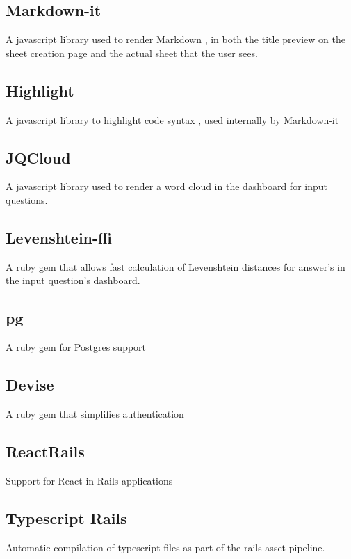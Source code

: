 \subsection{Markdown-it}
A javascript library used to render Markdown , in both the title preview on the sheet creation page and the actual sheet that the user sees.

\subsection{Highlight}
A javascript library to highlight code syntax , used internally by Markdown-it
	
\subsection{JQCloud}
A javascript library used to render a word cloud in the dashboard for input questions.

\subsection{Levenshtein-ffi}
A ruby gem that allows fast calculation of Levenshtein distances for answer's in the input question's dashboard.

\subsection{pg}
A ruby gem for Postgres support

\subsection{Devise}
A ruby gem that simplifies authentication

\subsection{ReactRails}
Support for React in Rails applications

\subsection{Typescript Rails}
Automatic compilation of typescript files as part of the rails asset pipeline.

